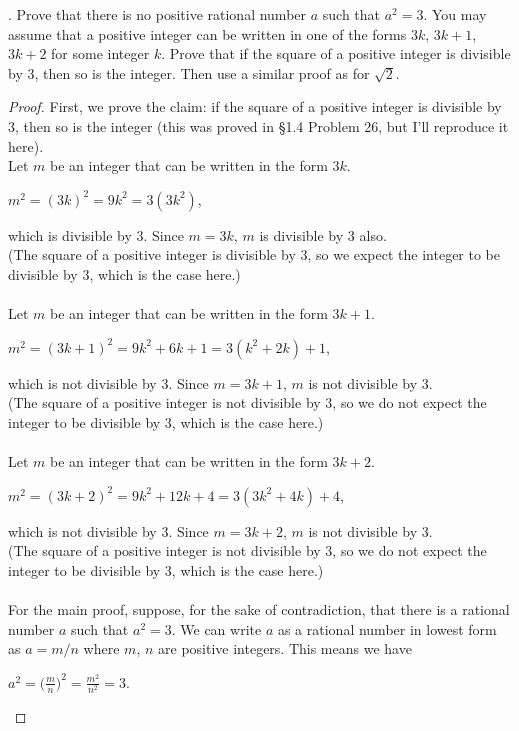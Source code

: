 \documentclass[12pt]{article}
\begin{document}
. Prove that there is no positive rational number $a$ such that $a^2=3$. You may assume that a positive integer can be written in one of the forms $3k$, $3k+1$, $3k+2$ for some integer $k$. Prove that if the square of a positive integer is divisible by 3, then so is the integer. Then use a similar proof as for $\sqrt2$.
\begin{proof}
First, we prove the claim: if the square of a positive integer is divisible by 3, then so is the integer (this was proved in §1.4 Problem 26, but I'll reproduce it here). \\
Let $m$ be an integer that can be written in the form $3k$.
\begin{center}
$m^2=(3k)^2=9k^2=3(3k^2)$,
\end{center}
which is divisible by $3$. Since $m=3k$, $m$ is divisible by $3$ also. \\
(The square of a positive integer is divisible by $3$, so we expect the integer to be divisible by $3$, which is the case here.) \\
\\
Let $m$ be an integer that can be written in the form $3k+1$.
\begin{center}
$m^2=(3k+1)^2=9k^2+6k+1=3(k^2+2k)+1$,
\end{center}
which is not divisible by $3$. Since $m=3k+1$, $m$ is not divisible by $3$. \\
(The square of a positive integer is not divisible by $3$, so we do not expect the integer to be divisible by $3$, which is the case here.) \\
\\
Let $m$ be an integer that can be written in the form $3k+2$.
\begin{center}
$m^2=(3k+2)^2=9k^2+12k+4=3(3k^2+4k)+4$,
\end{center}
which is not divisible by $3$. Since $m=3k+2$, $m$ is not divisible by $3$. \\
(The square of a positive integer is not divisible by $3$, so we do not expect the integer to be divisible by $3$, which is the case here.) \\
\\
For the main proof, suppose, for the sake of contradiction, that there is a rational number $a$ such that $a^2=3$. We can write $a$ as a rational number in lowest form as $a=m/n$ where $m$, $n$ are positive integers. This means we have
\begin{center}
$a^2=\displaystyle \bigg(\frac{m}{n}\bigg)^2=\displaystyle \frac{m^2}{n^2}=3$.

\end{center}
\end{proof}
\end{document}
